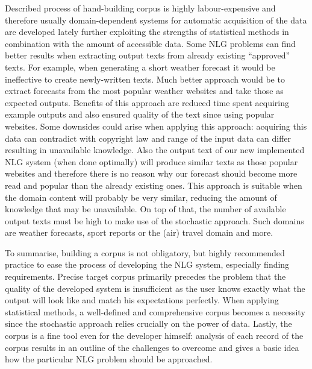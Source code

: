 Described process of hand-building corpus is highly labour-expensive and therefore usually domain-dependent systems for automatic acquisition of the data are developed lately further exploiting the strengths of statistical methods in combination with the amount of accessible data. Some NLG problems can find better results when extracting output texts from already existing “approved” texts. For example, when generating a short weather forecast it would be ineffective to create newly-written texts. Much better approach would be to extract forecasts from the most popular weather websites and take those as expected outputs. Benefits of this approach are reduced time spent acquiring example outputs and also ensured quality of the text since using popular websites. Some downsides could arise when applying this approach: acquiring this data can contradict with copyright law and range of the input data can differ resulting in unavailable knowledge. Also the output text of our new implemented NLG system (when done optimally) will produce similar texts as those popular websites and therefore there is no reason why our forecast should become more read and popular than the already existing ones. This approach is suitable when the domain content will probably be very similar, reducing the amount of knowledge that may be unavailable. On top of that, the number of available output texts must be high to make use of the stochastic approach. Such domains are weather forecasts, sport reports or the (air) travel domain and more.

To summarise, building a corpus is not obligatory, but highly recommended practice to ease the process of developing the NLG system, especially finding requirements. Precise target corpus primarily precedes the problem that the quality of the developed system is insufficient as the user knows exactly what the output will look like and match his expectations perfectly. When applying statistical methods, a well-defined and comprehensive corpus becomes a necessity since the stochastic approach relies crucially on the power of data. Lastly, the corpus is a fine tool even for the developer himself: analysis of each record of the corpus results in an outline of the challenges to overcome and gives a basic idea how the particular NLG problem should be approached.

